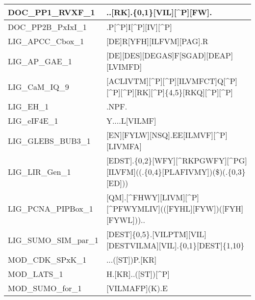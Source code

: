 \begin{landscape}
\begin{longtable}{|l|l|}
\hline
DOC\_PP1\_RVXF\_1      & ..[RK].\{0,1\}{[}VIL][\^{}P][FW].                                                                                          \\
\hline
DOC\_PP2B\_PxIxI\_1    & .P[\^{}P]I[\^{}P][IV][\^{}P]                                                                                               \\
\hline
LIG\_APCC\_Cbox\_1     & {[}DE]R[YFH][ILFVM][PAG].R                                                                                                 \\
\hline
LIG\_AP\_GAE\_1        & {[}DE][DES][DEGAS]F[SGAD][DEAP][LVIMFD]                                                                                    \\
\hline
LIG\_CaM\_IQ\_9        & {[}ACLIVTM][\^{}P][\^{}P][ILVMFCT]Q[\^{}P][\^{}P][\^{}P][RK][\^{}P]\{4,5\}{[}RKQ][\^{}P][\^{}P]                            \\
\hline
LIG\_EH\_1             & .NPF.                                                                                                                      \\
\hline
LIG\_eIF4E\_1          & Y....L[VILMF]                                                                                                              \\
\hline
LIG\_GLEBS\_BUB3\_1    & {[}EN][FYLW][NSQ].EE[ILMVF][\^{}P][LIVMFA]                                                                                 \\
\hline
LIG\_LIR\_Gen\_1       & {[}EDST].\{0,2\}{[}WFY][\^{}RKPGWFY][\^{}PG][ILVFM]((.\{0,4\}{[}PLAFIVMY])\textbar{}(\$)\textbar{}(.\{0,3\}{[}ED]))        \\
\hline
LIG\_PCNA\_PIPBox\_1   & {[}QM].[\^{}FHWY][LIVM][\^{}P][\^{}PFWYMLIV](([FYHL][FYW])\textbar{}([FYH][FYWL]))..                                       \\
\hline
LIG\_SUMO\_SIM\_par\_1 & {[}DEST]\{0,5\}.[VILPTM][VIL][DESTVILMA][VIL].\{0,1\}{[}DEST]\{1,10\}                                                      \\
\hline
MOD\_CDK\_SPxK\_1      & ...([ST])P.[KR]                                                                                                            \\
\hline
MOD\_LATS\_1           & H.[KR]..([ST])[\^{}P]                                                                                                      \\
\hline
MOD\_SUMO\_for\_1      & {[}VILMAFP](K).E                                                                                                           \\

\end{longtable}
\end{landscape}
